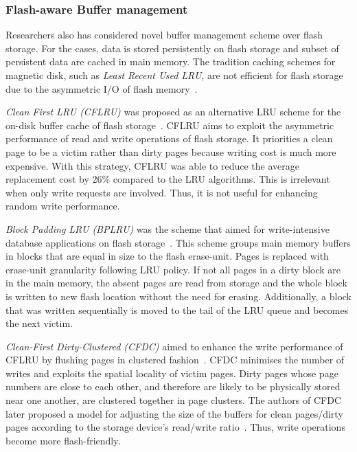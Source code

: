 \subsubsection{Flash-aware Buffer management}

Researchers also has considered novel buffer management scheme over flash storage.
For the cases, data is stored persistently on flash storage and subset of persistent data are cached in main memory.
The tradition caching schemes for magnetic disk, such as \textit{Least Recent Used LRU}, are not efficient for flash storage due to the asymmetric I/O of flash memory~\citep{Graefe:2007}.

\textit{Clean First LRU (CFLRU)} was proposed as an alternative LRU scheme for the on-disk buffer cache of flash storage~\citep{Park:2006}.
CFLRU aims to exploit the asymmetric performance of read and write operations of flash storage.
It priorities a clean page to be a victim rather than dirty pages because writing cost is much more expensive.
With this strategy, CFLRU was able to reduce the average replacement cost by 26$\%$ compared to the LRU algorithms.
This is irrelevant when only write requests are involved. 
Thus, it is not useful for enhancing random write performance.

\textit{Block Padding LRU (BPLRU)} was the scheme that aimed for write-intensive database applications on flash storage~\citep{Kim:2008}.
This scheme groups main memory buffers in blocks that are equal in size to the flash erase-unit. 
Pages is replaced with erase-unit granularity following LRU policy.
If not all pages in a dirty block are in the main memory, the absent pages are read from storage and the whole block is written to new flash location without the need for erasing.
Additionally, a block that was written sequentially is moved to the tail of the LRU queue and becomes the next victim.

\textit{Clean-First Dirty-Clustered (CFDC)} aimed to enhance the write performance of CFLRU by flushing pages in clustered fashion~\cite{Ou:2009}.
CFDC minimises the number of writes and exploits the spatial locality of victim pages.
Dirty pages whose page numbers are close to each other, and therefore are likely to be physically stored near one another, are clustered together in page clusters.
The authors of CFDC later proposed a model for adjusting the size of the buffers for clean pages/dirty pages according to the storage device's read/write ratio~\citep{Ou:2010}.
Thus, write operations become more flash-friendly.

